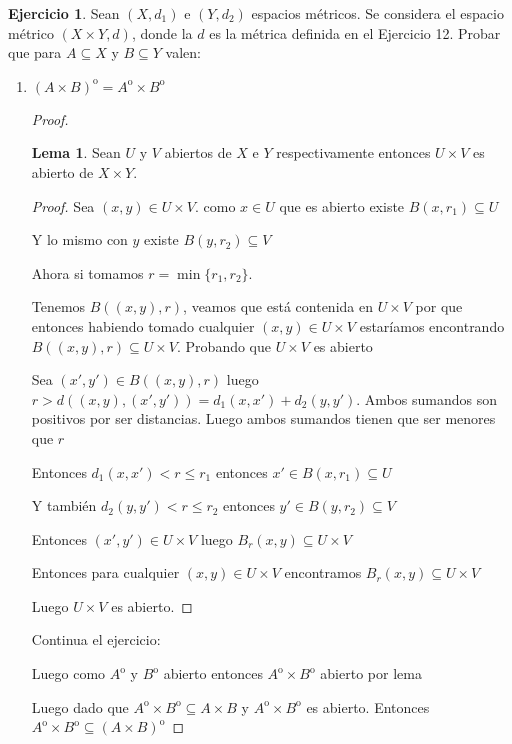 \documentclass[12pt]{report}
\newcommand{\open}{\mathrm{o}}
\theoremstyle{definition}
\newtheorem{lemma}[theorem]{Lema}
\newtheorem{ej}{Ejercicio}
\begin{document}
\begin{ej}
  Sean $(X,d_{1})$ e $(Y,d_{2})$ espacios métricos. Se considera el espacio métrico $(X \times Y , d)$, donde la $d$ es la métrica definida en el Ejercicio 12. Probar que para $A \subseteq X$ y $B \subseteq Y$ valen: 
  \begin{enumerate}
    \item $(A\times B)^{\open} = A^{\open} \times B^{\open}$
      \begin{proof}
	      \begin{lemma}
	Sean $U$ y $V$ abiertos de $X$ e $Y$ respectivamente entonces $U \times V$ es abierto de $X\times Y$.

\begin{proof}
	



	
	Sea $(x,y) \in U \times V$. como $x \in U$ que es abierto existe $B(x,r_{1}) \subseteq U$ 

	Y lo mismo con $y$ existe $B(y,r_{2}) \subseteq V$

	Ahora si tomamos $r = \min{\{r_{1},r_{2}\}}$. 

	Tenemos $B((x,y),r)$, veamos que está contenida en $U \times V$ por que entonces habiendo tomado cualquier $(x,y) \in U\times V$ estaríamos encontrando $B((x,y),r)\subseteq U\times V$. Probando que $U \times V$ es abierto

	Sea $(x',y') \in B((x,y),r)$ luego $ r > d((x,y),(x',y')) = d_{1}(x,x') + d_{2}(y,y') $. Ambos sumandos son positivos por ser distancias. Luego ambos sumandos tienen que ser menores que $r$

	Entonces $d_{1}(x,x') < r \leq r_{1} $ entonces $x' \in B(x,r_{1}) \subseteq U$

	Y también $d_{2}(y,y') < r \leq r_{2}$ entonces $y' \in B(y,r_{2}) \subseteq V$

	Entonces $(x',y') \in U \times V$ luego $B_{r}(x,y) \subseteq U \times V$

	Entonces para cualquier $(x,y) \in U \times V$ encontramos $B_{r}(x,y) \subseteq U \times V$

	Luego $U \times V$ es abierto.
\end{proof}
\end{lemma}

Continua el ejercicio:

	Luego como $A^{\open}$ y $B^{\open}$ abierto entonces $A^{\open} \times B^{\open}$ abierto por lema

	Luego dado que $A^{\open} \times B^{\open} \subseteq A \times B$ y $A^{\open} \times B^{\open}$ es abierto. Entonces $A^{\open} \times B^{\open} \subseteq (A \times B)^{\open}$


\end{proof}
\end{enumerate}
\end{ej}
\end{document}
